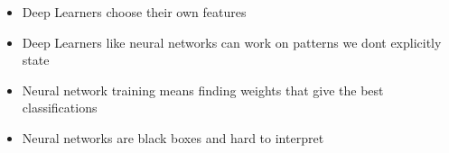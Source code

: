 \documentclass[
]{book}
\providecommand{\tightlist}{%
  \setlength{\itemsep}{0pt}\setlength{\parskip}{0pt}}
\newenvironment{roundup}
{ \begin{tcolorbox}[colbacktitle=yellow!50!white,
title=Round Up,coltitle=black,
fonttitle=\bfseries] }
{  \end{tcolorbox} }
\begin{document}
\begin{roundup}
\begin{itemize}
\tightlist
\item
  Deep Learners choose their own features
\item
  Deep Learners like neural networks can work on patterns we dont explicitly state
\item
  Neural network training means finding weights that give the best classifications
\item
  Neural networks are black boxes and hard to interpret
\end{itemize}
\end{roundup}

  
\end{document}
